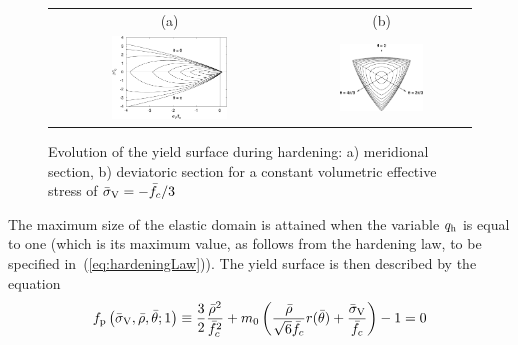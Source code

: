 \documentclass[a4paper]{article}
\begin{document}
\begin{figure}[!htb]
\centering
\begin{tabular}{cc}
(a) & (b)
\\
 \includegraphics[width=0.5\textwidth]{meridians}&
 \includegraphics[width=0.5\textwidth]{deviatoric}
\end{tabular} 
\caption{Evolution of the yield surface during hardening:
a) meridional section, b) deviatoric section for a constant volumetric effective stress of $\bar{\sigma}_{\rm V} = -\bar{f}_c/3$} 
\label{fig:surfaceMerDev}
\end{figure}

The maximum size of the elastic domain is attained when the variable $q_{\rm h}$ is equal to one (which is its maximum value, as follows from the hardening law, to be specified in~(\ref{eq:hardeningLaw})). The yield surface is then described by the equation
%
\begin{equation}\label{eq:failureSurface}
f_{\rm p}\left(\bar{\sigma}_{\rm V},\bar{\rho},\bar{\theta};1\right) \equiv \frac{3}{2} \frac{\bar{\rho}^2}{\bar{f}_c^2} + m_0 \left(\frac{\bar{\rho} }{\sqrt{6}\bar{f}_c}r(\bar{\theta}) + \frac{\bar{\sigma}_{\rm V}}{\bar{f}_c} \right) - 1 = 0
\end{equation}
\end{document}
